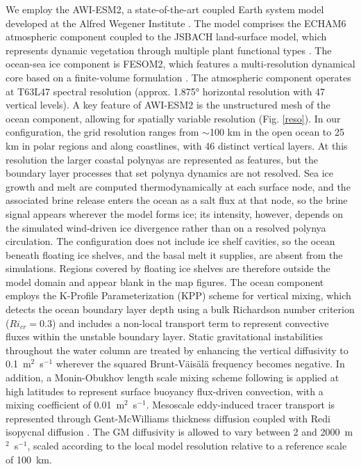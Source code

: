 \documentclass[pdflatex,sn-nature]{sn-jnl}
\begin{document}
We employ the AWI-ESM2, a state-of-the-art coupled Earth system model developed at the Alfred Wegener Institute \cite{sidorenko2019evaluation}. The model comprises the ECHAM6 atmospheric component \cite{stevens2013atmospheric} coupled to the JSBACH land-surface model, which represents dynamic vegetation through multiple plant functional types \cite{brovkin2009global,reick2021jsbach}. The ocean-sea ice component is FESOM2, which features a multi-resolution dynamical core based on a finite-volume formulation \cite{danilov2017finite}. The atmospheric component operates at T63L47 spectral resolution (approx. 1.875° horizontal resolution with 47 vertical levels). A key feature of AWI-ESM2 is the unstructured mesh of the ocean component, allowing for spatially variable resolution (Fig. \ref{reso}). In our configuration, the grid resolution ranges from $\sim$100 km in the open ocean to 25 km in polar regions and along coastlines, with 46 distinct vertical layers. At this resolution the larger coastal polynyas are represented as features, but the boundary layer processes that set polynya dynamics are not resolved. Sea ice growth and melt are computed thermodynamically at each surface node, and the associated brine release enters the ocean as a salt flux at that node, so the brine signal appears wherever the model forms ice; its intensity, however, depends on the simulated wind-driven ice divergence rather than on a resolved polynya circulation. The configuration does not include ice shelf cavities, so the ocean beneath floating ice shelves, and the basal melt it supplies, are absent from the simulations. Regions covered by floating ice shelves are therefore outside the model domain and appear blank in the map figures.
  The ocean component employs the K-Profile Parameterization (KPP) scheme
  \cite{large1994oceanic} for vertical mixing, which detects the ocean boundary
  layer depth using a bulk Richardson number criterion ($Ri_{cr} = 0.3$) and
  includes a non-local transport term to represent convective fluxes within the
  unstable boundary layer. Static gravitational instabilities throughout the water
  column are treated by enhancing the vertical diffusivity to 0.1~m$^2$~s$^{-1}$
  wherever the squared Brunt-V\"{a}is\"{a}l\"{a} frequency becomes negative.
  In addition, a Monin-Obukhov length scale mixing scheme following
  \cite{timmermann2004parameterization} is applied at high latitudes to represent
  surface buoyancy flux-driven convection, with a mixing coefficient of
  0.01~m$^2$~s$^{-1}$. Mesoscale eddy-induced tracer transport is represented through
  Gent-McWilliams thickness diffusion \cite{gent1990isopycnal,ferrari2008parameterization}
  coupled with Redi isopycnal diffusion \cite{redi1982oceanic}.  The GM diffusivity
  is allowed to vary between 2 and 2000~m$^2$~s$^{-1}$, scaled according to the
  local model resolution relative to a reference scale of 100~km.
\end{document}
